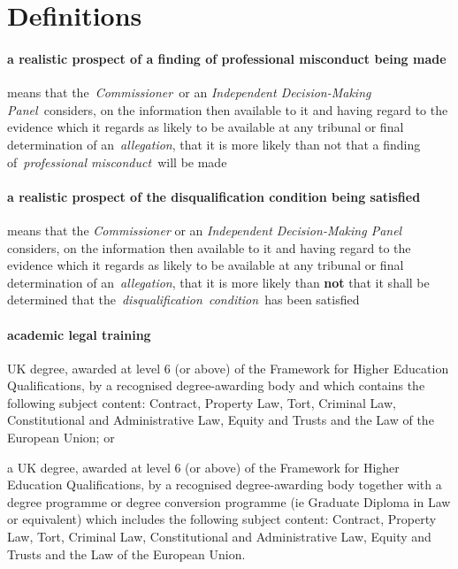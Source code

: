 \part{Definitions}
   \subsection{a realistic prospect of a finding of professional misconduct
  being made} means that the~\emph{Commissioner~}or
  an \emph{Independent Decision-Making Panel~}considers, on the
  information then available to it and having regard to the evidence
  which it regards as likely to be available at any tribunal or final
  determination of an~\emph{allegation}, that it is more likely than not
  that a finding of~\emph{professional misconduct~}will be made  \subsection{a realistic prospect of the disqualification condition being
  satisfied } means that the \emph{Commissioner} or an \emph{Independent
  Decision-Making Panel} considers, on the information then available to
  it and having regard to the evidence which it regards as likely to be
  available at any tribunal or final determination of
  an~\emph{allegation}, that it is more likely than \textbf{not} that it shall be
  determined that the~\emph{disqualification~condition~}has been
  satisfied  \subsection{academic legal training }
\al \item UK degree, awarded at level 6
  (or above) of the Framework for Higher Education Qualifications, by a
  recognised degree-awarding body and which contains the following
  subject content: Contract, Property Law, Tort, Criminal Law,
  Constitutional and Administrative Law, Equity and Trusts and the Law
  of the European Union; or
  \item a UK degree, awarded at level 6 (or
  above) of the Framework for Higher Education Qualifications, by a
  recognised degree-awarding body together with a degree programme or
  degree conversion programme (ie Graduate Diploma in Law or equivalent)
  which includes the following subject content: Contract, Property Law,
  Tort, Criminal Law, Constitutional and Administrative Law, Equity and
  Trusts and the Law of the European Union. \la

